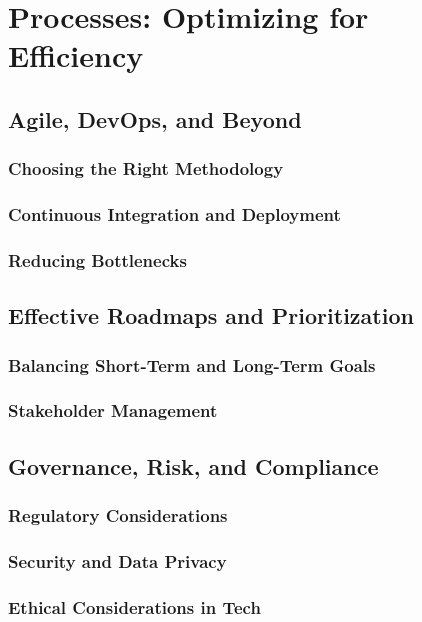 \chapter{Processes: Optimizing for Efficiency}
\section{Agile, DevOps, and Beyond}
\subsection{Choosing the Right Methodology}
\subsection{Continuous Integration and Deployment}
\subsection{Reducing Bottlenecks}
\section{Effective Roadmaps and Prioritization}
\subsection{Balancing Short-Term and Long-Term Goals}
\subsection{Stakeholder Management}
\section{Governance, Risk, and Compliance}
\subsection{Regulatory Considerations}
\subsection{Security and Data Privacy}
\subsection{Ethical Considerations in Tech}